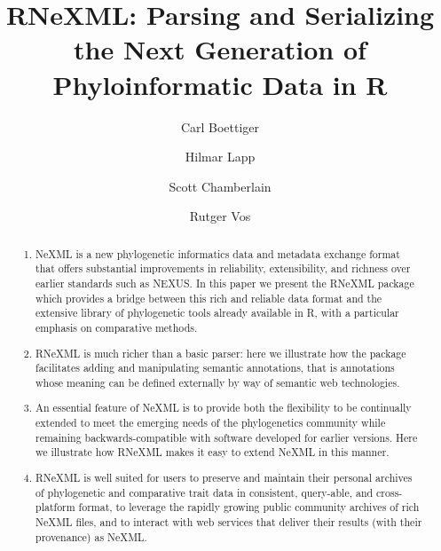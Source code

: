 \documentclass[author-year, review, 11pt]{components/elsarticle} %
\begin{document}
\begin{frontmatter}

  \title{RNeXML: Parsing and Serializing the Next Generation of Phyloinformatic
Data in R}
    \author[cstar]{Carl Boettiger}
    \author[NESCent]{Hilmar Lapp}
  
  
    \author[SimonFraser]{Scott Chamberlain}
  
  
    \author[NBC]{Rutger Vos}
  
  
      \address[cstar]{Center for Stock Assessment Research, Department of Applied Math and
Statistics, University of California, Mail Stop SOE-2, Santa Cruz, CA
95064, USA}    
    \address[NESCent]{National Evolutionary Synthesis Center, Durham, NC, USA}    
    \address[SimonFraser]{Department of Biology, Simon Fraser University, Burnaby, Canada}    
    \address[NBC]{Naturalis Biodiversity Center, Leiden, the Netherlands}    
  
  \begin{abstract}
  \begin{enumerate}
  \def\labelenumi{\arabic{enumi}.}
  \item
    NeXML is a new phylogenetic informatics data and metadata exchange
    format that offers substantial improvements in reliability,
    extensibility, and richness over earlier standards such as NEXUS. In
    this paper we present the RNeXML package which provides a bridge
    between this rich and reliable data format and the extensive library
    of phylogenetic tools already available in R, with a particular
    emphasis on comparative methods.
  \item
    RNeXML is much richer than a basic parser: here we illustrate how the
    package facilitates adding and manipulating semantic annotations, that
    is annotations whose meaning can be defined externally by way of
    semantic web technologies.
  \item
    An essential feature of NeXML is to provide both the flexibility to be
    continually extended to meet the emerging needs of the phylogenetics
    community while remaining backwards-compatible with software developed
    for earlier versions. Here we illustrate how RNeXML makes it easy to
    extend NeXML in this manner.
  \item
    RNeXML is well suited for users to preserve and maintain their
    personal archives of phylogenetic and comparative trait data in
    consistent, query-able, and cross-platform format, to leverage the
    rapidly growing public community archives of rich NeXML files, and to
    interact with web services that deliver their results (with their
    provenance) as NeXML.
  \end{enumerate}
  \end{abstract}
  
 \end{frontmatter}
\end{document}
